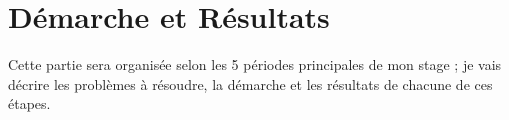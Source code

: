 \chapter{Démarche et Résultats}
Cette partie sera organisée selon les 5 périodes principales de mon stage ; je vais décrire les problèmes à résoudre, la démarche et les résultats de chacune de ces étapes. 





